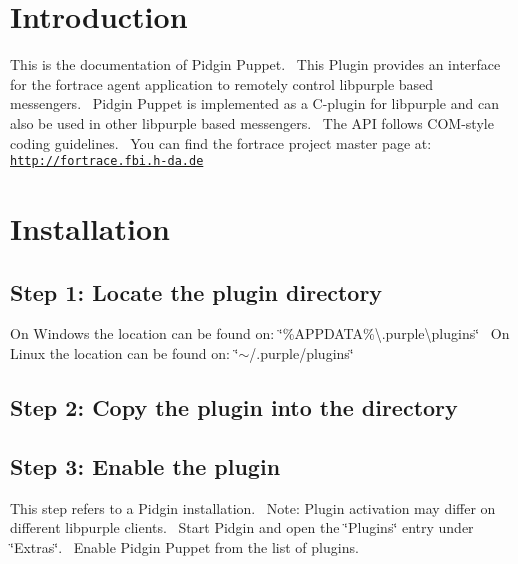 \hypertarget{index_intro_sec}{}\section{Introduction}\label{index_intro_sec}
This is the documentation of Pidgin Puppet.~\newline
 This Plugin provides an interface for the fortrace agent application to remotely control libpurple based messengers.~\newline
 Pidgin Puppet is implemented as a C-\/plugin for libpurple and can also be used in other libpurple based messengers.~\newline
 The A\+PI follows C\+O\+M-\/style coding guidelines.~\newline
 You can find the fortrace project master page at\+: \href{http://fortrace.fbi.h-da.de}{\tt http\+://fortrace.\+fbi.\+h-\/da.\+de}\hypertarget{index_install_sec}{}\section{Installation}\label{index_install_sec}
\hypertarget{index_step1}{}\subsection{Step 1\+: Locate the plugin directory}\label{index_step1}
On Windows the location can be found on\+: \char`\"{}\%\+A\+P\+P\+D\+A\+T\+A\%\textbackslash{}.\+purple\textbackslash{}plugins\char`\"{}~\newline
 On Linux the location can be found on\+: \char`\"{}$\sim$/.\+purple/plugins\char`\"{}\hypertarget{index_step2}{}\subsection{Step 2\+: Copy the plugin into the directory}\label{index_step2}
\hypertarget{index_step3}{}\subsection{Step 3\+: Enable the plugin}\label{index_step3}
This step refers to a Pidgin installation.~\newline
 Note\+: Plugin activation may differ on different libpurple clients.~\newline
 Start Pidgin and open the \char`\"{}\+Plugins\char`\"{} entry under \char`\"{}\+Extras\char`\"{}.~\newline
 Enable Pidgin Puppet from the list of plugins.~\newline
